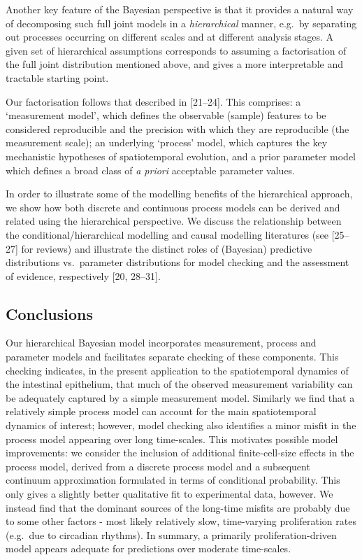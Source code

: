 \documentclass[10pt,letterpaper]{article}
\begin{document}
Another key feature of the Bayesian perspective is that it provides a
natural way of decomposing such full joint models in a
\emph{hierarchical} manner, e.g.~by separating out processes occurring
on different scales and at different analysis stages. A given set of
hierarchical assumptions corresponds to assuming a factorisation of the
full joint distribution mentioned above, and gives a more interpretable
and tractable starting point.

Our factorisation follows that described in {[}21--24{]}. This
comprises: a `measurement model', which defines the observable (sample)
features to be considered reproducible and the precision with which they
are reproducible (the measurement scale); an underlying `process' model,
which captures the key mechanistic hypotheses of spatiotemporal
evolution, and a prior parameter model which defines a broad class of
\emph{a priori} acceptable parameter values.

In order to illustrate some of the modelling benefits of the
hierarchical approach, we show how both discrete and continuous process
models can be derived and related using the hierarchical perspective. We
discuss the relationship between the conditional/hierarchical modelling
and causal modelling literatures (see {[}25--27{]} for reviews) and
illustrate the distinct roles of (Bayesian) predictive distributions
vs.~parameter distributions for model checking and the assessment of
evidence, respectively {[}20, 28--31{]}.

\subsection{Conclusions}\label{conclusions}

Our hierarchical Bayesian model incorporates measurement, process and
parameter models and facilitates separate checking of these components.
This checking indicates, in the present application to the
spatiotemporal dynamics of the intestinal epithelium, that much of the
observed measurement variability can be adequately captured by a simple
measurement model. Similarly we find that a relatively simple process
model can account for the main spatiotemporal dynamics of interest;
however, model checking also identifies a minor misfit in the process
model appearing over long time-scales. This motivates possible model
improvements: we consider the inclusion of additional finite-cell-size
effects in the process model, derived from a discrete process model and
a subsequent continuum approximation formulated in terms of conditional
probability. This only gives a slightly better qualitative fit to
experimental data, however. We instead find that the dominant sources of
the long-time misfits are probably due to some other factors - most
likely relatively slow, time-varying proliferation rates (e.g.~due to
circadian rhythms). In summary, a primarily proliferation-driven model
appears adequate for predictions over moderate time-scales.
\end{document}

